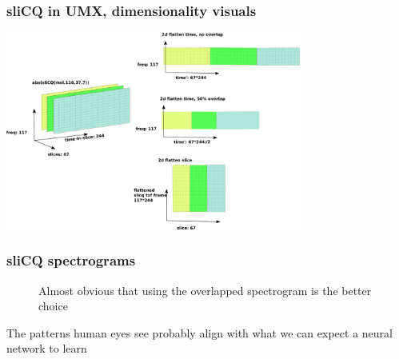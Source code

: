 \documentclass[usenames,dvipsnames]{beamer}
\begin{document}
\begin{frame}
	\frametitle{sliCQ in UMX, dimensionality visuals}
	\includegraphics[height=6.5cm]{./umxslicqdimred.png}
\end{frame}

\begin{frame}
	\frametitle{sliCQ spectrograms}
	\begin{figure}
		\caption{Almost obvious that using the overlapped spectrogram is the better choice}
	\end{figure}
	The patterns human eyes see probably align with what we can expect a neural network to learn
\end{frame}
\end{document}
